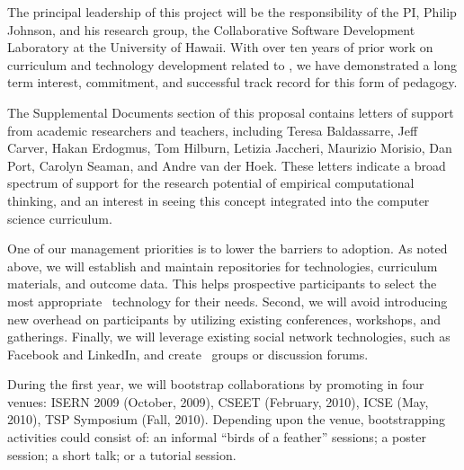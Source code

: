 

The principal leadership of this project will be the responsibility of the
PI, Philip Johnson, and his research group, the Collaborative Software
Development Laboratory at the University of Hawaii.  With over ten years of
prior work on curriculum and technology development related to \eCT, we have
demonstrated a long term interest, commitment, and successful track record
for this form of pedagogy.

The Supplemental Documents section of this proposal contains letters of
support from academic researchers and teachers, including Teresa
Baldassarre, Jeff Carver, Hakan Erdogmus, Tom Hilburn, Letizia Jaccheri,
Maurizio Morisio, Dan Port, Carolyn Seaman, and Andre van der Hoek.  These
letters indicate a broad spectrum of support for the research potential of
empirical computational thinking, and an interest in seeing this concept
integrated into the computer science curriculum.

One of our management priorities is to lower the barriers to adoption.  As
noted above, we will establish and maintain repositories for technologies,
curriculum materials, and outcome data.  This helps prospective
participants to select the most appropriate \eCT\ technology for their
needs.  Second, we will avoid introducing new overhead on participants by
utilizing existing conferences, workshops, and gatherings.  Finally, we
will leverage existing social network technologies, such as Facebook and
LinkedIn, and create \eCT\ groups or discussion forums.

During the first year, we will bootstrap collaborations by promoting \eCT
in four venues: ISERN 2009 (October, 2009), CSEET (February, 2010), ICSE
(May, 2010), TSP Symposium (Fall, 2010). Depending upon the venue,
bootstrapping activities could consist of: an informal ``birds of a
feather'' sessions; a poster session; a short talk; or a tutorial session.  

